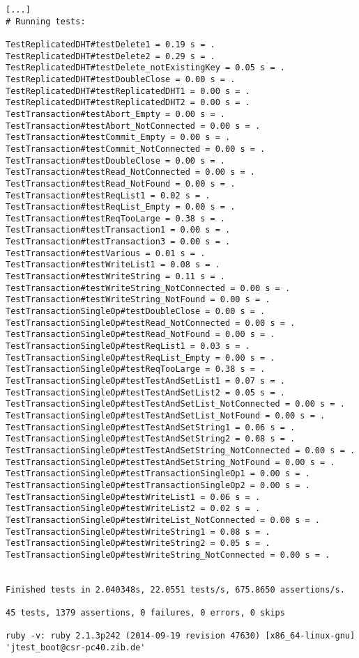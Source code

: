 \begin{lstlisting}[language={}]
%> make ruby-test
[...]
# Running tests:

TestReplicatedDHT#testDelete1 = 0.19 s = .
TestReplicatedDHT#testDelete2 = 0.29 s = .
TestReplicatedDHT#testDelete_notExistingKey = 0.05 s = .
TestReplicatedDHT#testDoubleClose = 0.00 s = .
TestReplicatedDHT#testReplicatedDHT1 = 0.00 s = .
TestReplicatedDHT#testReplicatedDHT2 = 0.00 s = .
TestTransaction#testAbort_Empty = 0.00 s = .
TestTransaction#testAbort_NotConnected = 0.00 s = .
TestTransaction#testCommit_Empty = 0.00 s = .
TestTransaction#testCommit_NotConnected = 0.00 s = .
TestTransaction#testDoubleClose = 0.00 s = .
TestTransaction#testRead_NotConnected = 0.00 s = .
TestTransaction#testRead_NotFound = 0.00 s = .
TestTransaction#testReqList1 = 0.02 s = .
TestTransaction#testReqList_Empty = 0.00 s = .
TestTransaction#testReqTooLarge = 0.38 s = .
TestTransaction#testTransaction1 = 0.00 s = .
TestTransaction#testTransaction3 = 0.00 s = .
TestTransaction#testVarious = 0.01 s = .
TestTransaction#testWriteList1 = 0.08 s = .
TestTransaction#testWriteString = 0.11 s = .
TestTransaction#testWriteString_NotConnected = 0.00 s = .
TestTransaction#testWriteString_NotFound = 0.00 s = .
TestTransactionSingleOp#testDoubleClose = 0.00 s = .
TestTransactionSingleOp#testRead_NotConnected = 0.00 s = .
TestTransactionSingleOp#testRead_NotFound = 0.00 s = .
TestTransactionSingleOp#testReqList1 = 0.03 s = .
TestTransactionSingleOp#testReqList_Empty = 0.00 s = .
TestTransactionSingleOp#testReqTooLarge = 0.38 s = .
TestTransactionSingleOp#testTestAndSetList1 = 0.07 s = .
TestTransactionSingleOp#testTestAndSetList2 = 0.05 s = .
TestTransactionSingleOp#testTestAndSetList_NotConnected = 0.00 s = .
TestTransactionSingleOp#testTestAndSetList_NotFound = 0.00 s = .
TestTransactionSingleOp#testTestAndSetString1 = 0.06 s = .
TestTransactionSingleOp#testTestAndSetString2 = 0.08 s = .
TestTransactionSingleOp#testTestAndSetString_NotConnected = 0.00 s = .
TestTransactionSingleOp#testTestAndSetString_NotFound = 0.00 s = .
TestTransactionSingleOp#testTransactionSingleOp1 = 0.00 s = .
TestTransactionSingleOp#testTransactionSingleOp2 = 0.00 s = .
TestTransactionSingleOp#testWriteList1 = 0.06 s = .
TestTransactionSingleOp#testWriteList2 = 0.02 s = .
TestTransactionSingleOp#testWriteList_NotConnected = 0.00 s = .
TestTransactionSingleOp#testWriteString1 = 0.08 s = .
TestTransactionSingleOp#testWriteString2 = 0.05 s = .
TestTransactionSingleOp#testWriteString_NotConnected = 0.00 s = .


Finished tests in 2.040348s, 22.0551 tests/s, 675.8650 assertions/s.

45 tests, 1379 assertions, 0 failures, 0 errors, 0 skips

ruby -v: ruby 2.1.3p242 (2014-09-19 revision 47630) [x86_64-linux-gnu]
'jtest_boot@csr-pc40.zib.de'
\end{lstlisting}

